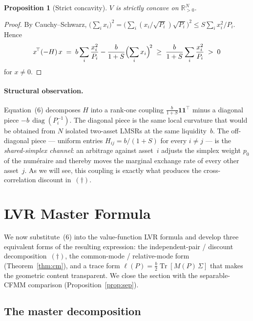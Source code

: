 \documentclass[11pt]{article}
\newtheorem{proposition}{Proposition}
\DeclareMathOperator{\Tr}{Tr}
\DeclareMathOperator{\diag}{diag}
\newcommand{\R}{\mathbb{R}}
\newcommand{\one}{\mathbf{1}}
\newcommand{\transp}{^{\!\top}}
\begin{document}
\begin{proposition}[Strict concavity]\label{prop:concave}
$V$ is strictly concave on $\R^N_{>0}$.
\end{proposition}
\begin{proof}
By Cauchy--Schwarz, $\bigl(\sum_i x_i\bigr)^2 = \bigl(\sum_i (x_i/\sqrt{P_i})\sqrt{P_i}\bigr)^2 \le S\sum_i x_i^2/P_i$. Hence
\[
x\transp(-H)\,x \;=\; b\sum_i \frac{x_i^2}{P_i} - \frac{b}{1+S}\Bigl(\sum_i x_i\Bigr)^{\!2} \;\ge\; \frac{b}{1+S}\sum_i \frac{x_i^2}{P_i} \;>\; 0
\]
for $x \ne 0$.
\end{proof}

\paragraph{Structural observation.} Equation~(6) decomposes $H$ into a rank-one coupling $\tfrac{b}{1+S}\one\one\transp$ minus a diagonal piece $-b\,\diag(P_i^{-1})$. The diagonal piece is the same local curvature that would be obtained from $N$ isolated two-asset LMSRs at the same liquidity~$b$. The off-diagonal piece --- uniform entries $H_{ij} = b/(1+S)$ for every $i \ne j$ --- is the \emph{shared-simplex channel}: an arbitrage against asset~$i$ adjusts the simplex weight $p_0$ of the num\'eraire and thereby moves the marginal exchange rate of every other asset~$j$. As we will see, this coupling is exactly what produces the cross-correlation discount in~$(\dagger)$.

\section{LVR Master Formula}\label{sec:lvr}

We now substitute~(6) into the value-function LVR formula and develop three equivalent forms of the resulting expression: the independent-pair / discount decomposition~$(\dagger)$, the common-mode / relative-mode form (Theorem~\ref{thm:cm}), and a trace form $\ell(P) = \tfrac{b}{2}\Tr[M(P)\,\Sigma]$ that makes the geometric content transparent. We close the section with the separable-CFMM comparison (Proposition~\ref{prop:sep}).

\subsection{The master decomposition}
\end{document}
